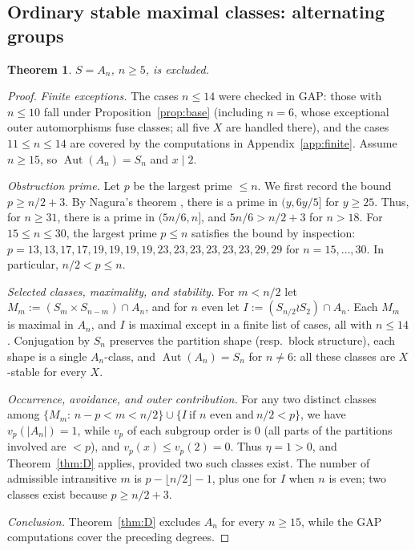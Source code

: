 \documentclass[11pt]{amsart}
\newtheorem{theorem}{Theorem}[section]
\theoremstyle{definition}
\theoremstyle{remark}
\DeclareMathOperator{\Aut}{Aut}
\newcommand{\vp}[1]{v_{#1}}
\begin{document}
\subsection{Ordinary stable maximal classes: alternating groups}

\begin{theorem}\label{thm:an}
$S=A_n$, $n\geq5$, is excluded.
\end{theorem}

\begin{proof}
\emph{Finite exceptions.} The cases $n\leq14$ were checked in GAP: those with
$n\leq10$ fall under
Proposition~\ref{prop:base} (including $n=6$, whose exceptional outer
automorphisms fuse classes; all five $X$ are handled there), and
the cases $11\leq n\leq14$ are covered by the computations in
Appendix~\ref{app:finite}.
Assume $n\geq15$, so $\Aut(A_n)=S_n$ and $x\mid2$.

\emph{Obstruction prime.} Let $p$ be the largest prime $\leq n$. We first record the bound
$p\geq n/2+3$. By Nagura's theorem
\cite[Theorem, pp.~180--181]{Nagura}, there is a prime in $(y,6y/5]$
for $y\geq25$. Thus, for $n\geq31$, there is a prime in $(5n/6,n]$,
and $5n/6>n/2+3$ for $n>18$. For $15\leq n\leq30$, the largest prime
$p\leq n$ satisfies the bound by inspection:
$p=13,13,17,17,19,19,19,19,23,23,23,23,23,23,29,29$ for
$n=15,\dots,30$. In particular, $n/2<p\leq n$.

\emph{Selected classes, maximality, and stability.} For $m<n/2$ let
$M_m:=(S_m\times S_{n-m})\cap A_n$, and for $n$ even let
$I:=(S_{n/2}\wr S_2)\cap A_n$. Each $M_m$ is maximal in $A_n$, and $I$
is maximal except in a finite list of cases, all with $n\leq14$
\cite[Thm.~1 and Tables~I--II, pp.~366--368]{LPS1987}.
Conjugation by $S_n$ preserves the partition shape
(resp.\ block structure), each shape is a single $A_n$-class, and
$\Aut(A_n)=S_n$ for $n\neq6$: all these classes are $X$-stable for every
$X$.

\emph{Occurrence, avoidance, and outer contribution.}
For any two distinct classes among
$\{M_m:\,n-p<m<n/2\}\cup\{I\ \text{if $n$ even and}\ n/2<p\}$, we have
$\vp{p}(|A_n|)=1$, while $\vp{p}$ of each
subgroup order is $0$ (all parts of the partitions involved are $<p$),
and $\vp{p}(x)\leq\vp{p}(2)=0$. Thus $\eta=1>0$, and
Theorem~\ref{thm:D} applies, provided two such classes
exist. The number of admissible intransitive $m$ is
$p-\lfloor n/2\rfloor-1$, plus one for $I$ when $n$ is even; two classes
exist because $p\geq n/2+3$.

\emph{Conclusion.} Theorem~\ref{thm:D} excludes $A_n$ for every
$n\geq15$, while the GAP computations cover the preceding degrees.
\end{proof}
\end{document}
